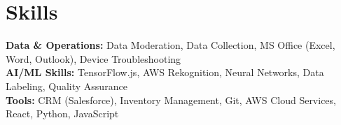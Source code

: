 \documentclass[11pt]{article}       %
\begin{document}

\vspace{-18.5pt}

\section*{Skills}
\textbf{Data \& Operations:} Data Moderation, Data Collection, MS Office (Excel, Word, Outlook), Device Troubleshooting\\
\textbf{AI/ML Skills:} TensorFlow.js, AWS Rekognition, Neural Networks, Data Labeling, Quality Assurance\\
\textbf{Tools:} CRM (Salesforce), Inventory Management, Git, AWS Cloud Services, React, Python, JavaScript\\

\vspace{-6.5pt}
\end{document}
